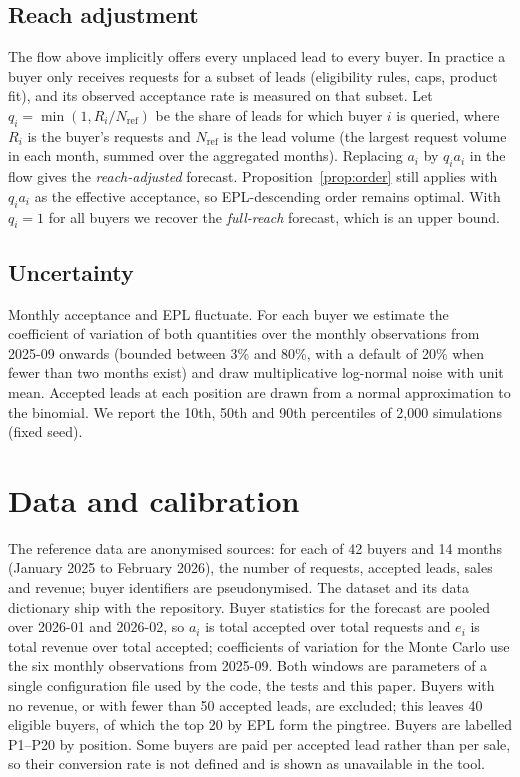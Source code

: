 \documentclass[10pt,a4paper]{article}
\begin{document}
\subsection{Reach adjustment}\label{sec:reach}
The flow above implicitly offers every unplaced lead to every buyer. In practice a buyer only receives requests for a subset of leads (eligibility rules, caps, product fit), and its observed acceptance rate is measured on that subset. Let $q_i=\min(1,R_i/N_{\mathrm{ref}})$ be the share of leads for which buyer $i$ is queried, where $R_i$ is the buyer's requests and $N_{\mathrm{ref}}$ is the lead volume (the largest request volume in each month, summed over the aggregated months). Replacing $a_i$ by $q_ia_i$ in the flow gives the \emph{reach-adjusted} forecast. Proposition~\ref{prop:order} still applies with $q_ia_i$ as the effective acceptance, so EPL-descending order remains optimal. With $q_i=1$ for all buyers we recover the \emph{full-reach} forecast, which is an upper bound.

\subsection{Uncertainty}
Monthly acceptance and EPL fluctuate. For each buyer we estimate the coefficient of variation of both quantities over the monthly observations from 2025-09 onwards (bounded between 3\% and 80\%, with a default of 20\% when fewer than two months exist) and draw multiplicative log-normal noise with unit mean. Accepted leads at each position are drawn from a normal approximation to the binomial. We report the 10th, 50th and 90th percentiles of 2{,}000 simulations (fixed seed).

\section{Data and calibration}
The reference data are anonymised sources: for each of 42 buyers and 14 months (January 2025 to February 2026), the number of requests, accepted leads, sales and revenue; buyer identifiers are pseudonymised. The dataset and its data dictionary ship with the repository. Buyer statistics for the forecast are pooled over 2026-01 and 2026-02, so $a_i$ is total accepted over total requests and $e_i$ is total revenue over total accepted; coefficients of variation for the Monte Carlo use the six monthly observations from 2025-09. Both windows are parameters of a single configuration file used by the code, the tests and this paper. Buyers with no revenue, or with fewer than 50 accepted leads, are excluded; this leaves 40 eligible buyers, of which the top 20 by EPL form the pingtree. Buyers are labelled P1--P20 by position. Some buyers are paid per accepted lead rather than per sale, so their conversion rate is not defined and is shown as unavailable in the tool.
\end{document}
